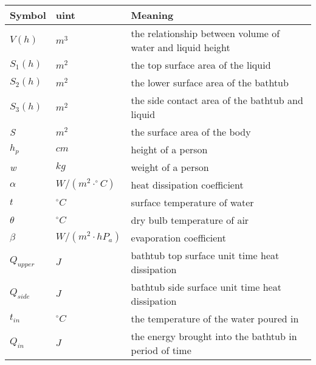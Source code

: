\documentclass{mcmthesis}
\begin{document}
\begin{table}[H]
        \setlength{\abovecaptionskip}{0pt}
        \setlength{\belowcaptionskip}{0pt}
         \\
        \begin{tabular}{p{1.8cm}|p{2.2cm}|p{9cm}}
        \hline
        \rowcolor[gray]{0.9}\bf{Symbol}	&\bf{uint}      &\bf{Meaning}\\
        \hline
        $V(h)$			& $m^3  $		 & the relationship between volume of water and liquid height \\
        $S_{1}(h)$		& $m^2  $		 & the top surface area of the liquid 	\\
        $S_{2}(h)$		& $m^2  $		 & the lower surface area of the bathtub 	\\
        $S_{3}(h)$		& $m^2  $		 & the side contact area of the bathtub and liquid 	\\
        \emph{S}	& $m^2  $		 & the surface area of the body\\
        ${h_{p}}$	& $cm	$        & height of a person \\
        \emph{w}	& $kg	$        & weight of a person \\
        $\alpha$		& $ W/(m^{2}\cdot^{\circ}C)  $		 & heat dissipation coefficient\\
        $t$		& $ ^{\circ}C  $		 & surface temperature of water \\
        $\theta$		& $^{\circ}C$		 & dry bulb temperature of air\\
        $\beta$		& $W/(m^{2}\cdot hP_{a})$		 & evaporation coefficient\\
        $Q_{upper}$		& $J$		 & bathtub top surface unit time heat dissipation\\
		$Q_{side}$		& $J$		 & bathtub side surface unit time heat dissipation\\
		$t_{in}$		& ${^\circ}C$		 & the temperature of the water poured in\\
		$Q_{in}$		& $J$		 & the energy brought into the bathtub in period of time \\
		        \hline
        \end{tabular}
        \end{table}

\end{document}

